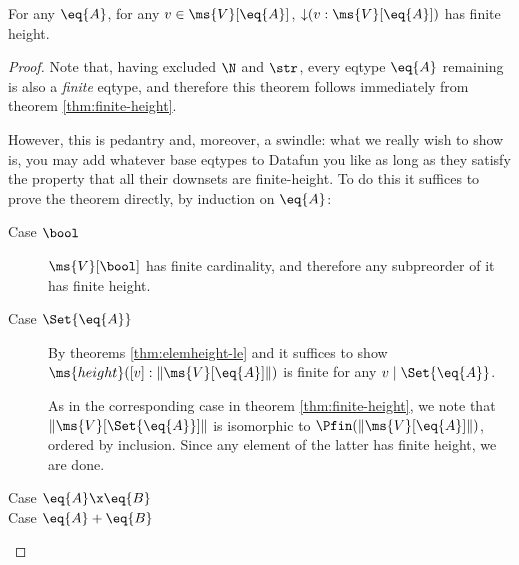 \documentclass{article}
\newcommand{\widevec}[1]{\overrightarrow{#1}}
\newcommand{\eqposet}[1]{\ms{Eq}(#1)}
\renewcommand{\eqposet}[1]{\|{#1}\|}
\newcommand{\eqclass}[1]{[#1]}
\newcommand{\height}{\ms{height}}
\newcommand{\elemheight}[2]{\height(#2 : #1)}
\newcommand{\down}[2]{\mathop{\downarrow}(#2 : #1)}
\newcommand{\lr}[2]{#2\mathrel{|}#1}
\newcommand{\Val}[1]{\ms{V}[#1]}
\begin{document}
\begin{theorem}
  For any $\eq{A}$, for any $v \in \Val{\eq{A}}$, $\down{\Val{\eq{A}}}{v}$ has
  finite height.
\end{theorem}

\begin{proof}
  Note that, having excluded $\N$ and $\str$, every eqtype $\eq{A}$ remaining is
  also a \emph{finite} eqtype, and therefore this theorem follows immediately
  from theorem \ref{thm:finite-height}.

  However, this is pedantry and, moreover, a swindle: what we really wish to
  show is, you may add whatever base eqtypes to Datafun you like as long as they
  satisfy the property that all their downsets are finite-height. To do this it
  suffices to prove the theorem directly, by induction on $\eq{A}$:
  \begin{description}
  \item[Case $\bool$] $\Val{\bool}$ has finite cardinality, and therefore any
    subpreorder of it has finite height.


  \item[Case $\Set{\eq{A}}$] By theorems \ref{thm:elemheight-le} and it suffices
    to show $\elemheight{\eqposet{\Val{\eq{A}}}}{\eqclass{v}}$ is finite for any
    $\lr{\Set{\eq{A}}}{v}$.

    As in the corresponding case in theorem \ref{thm:finite-height}, we note
    that $\eqposet{\Val{\Set{\eq{A}}}}$ is isomorphic to
    $\Pfin(\eqposet{\Val{\eq{A}}})$, ordered by inclusion. Since any element of
    the latter has finite height, we are done.



  \item[Case $\eq{A} \x \eq{B}$] \TODO
  \item[Case $\eq{A} + \eq{B}$] \TODO
  \end{description}
\end{proof}
\end{document}
